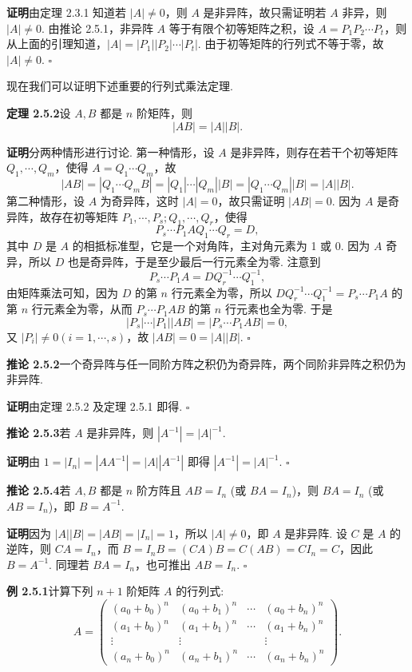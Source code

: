 \documentclass[UTF8, 12pt, fontset=fandol, oneside]{ctexart}
\begin{document}
\noindent\textbf{证明}\quad 由定理 2.3.1 知道若 $|A|\ne 0$，则 $A$ 是非异阵，故只需证明若 $A$ 非异，则 $|A|\ne 0$. 由推论 2.5.1，非异阵 $A$ 等于有限个初等矩阵之积，设 $A=P_1P_2\cdots P_t$，则从上面的引理知道，$|A|=|P_1||P_2|\cdots |P_t|$. 由于初等矩阵的行列式不等于零，故 $|A|\ne 0$. $\square$

现在我们可以证明下述重要的行列式乘法定理.

\noindent\textbf{定理 2.5.2}\quad 设 $A,B$ 都是 $n$ 阶矩阵，则
\[
|AB|=|A||B|.
\]

\noindent\textbf{证明}\quad 分两种情形进行讨论. 第一种情形，设 $A$ 是非异阵，则存在若干个初等矩阵 $Q_1,\cdots,Q_m$，使得 $A=Q_1\cdots Q_m$，故
\[
|AB|=|Q_1\cdots Q_mB|=|Q_1|\cdots |Q_m||B|=|Q_1\cdots Q_m||B|=|A||B|.
\]
第二种情形，设 $A$ 为奇异阵，这时 $|A|=0$，故只需证明 $|AB|=0$. 因为 $A$ 是奇异阵，故存在初等矩阵 $P_1,\cdots,P_s;Q_1,\cdots,Q_r$，使得
\[
P_s\cdots P_1AQ_1\cdots Q_r=D,
\]
其中 $D$ 是 $A$ 的相抵标准型，它是一个对角阵，主对角元素为 1 或 0. 因为 $A$ 奇异，所以 $D$ 也是奇异阵，于是至少最后一行元素全为零. 注意到
\[
P_s\cdots P_1A=DQ_r^{-1}\cdots Q_1^{-1},
\]
由矩阵乘法可知，因为 $D$ 的第 $n$ 行元素全为零，所以 $DQ_r^{-1}\cdots Q_1^{-1}=P_s\cdots P_1A$ 的第 $n$ 行元素全为零，从而 $P_s\cdots P_1AB$ 的第 $n$ 行元素也全为零. 于是
\[
|P_s|\cdots |P_1||AB|=|P_s\cdots P_1AB|=0,
\]
又 $|P_i|\ne 0(i=1,\cdots,s)$，故 $|AB|=0=|A||B|$. $\square$

\noindent\textbf{推论 2.5.2}\quad 一个奇异阵与任一同阶方阵之积仍为奇异阵，两个同阶非异阵之积仍为非异阵.

\noindent\textbf{证明}\quad 由定理 2.5.2 及定理 2.5.1 即得. $\square$

\noindent\textbf{推论 2.5.3}\quad 若 $A$ 是非异阵，则 $|A^{-1}|=|A|^{-1}$.

\noindent\textbf{证明}\quad 由 $1=|I_n|=|AA^{-1}|=|A||A^{-1}|$ 即得 $|A^{-1}|=|A|^{-1}$. $\square$

\noindent\textbf{推论 2.5.4}\quad 若 $A,B$ 都是 $n$ 阶方阵且 $AB=I_n$ (或 $BA=I_n$)，则 $BA=I_n$ (或 $AB=I_n$)，即 $B=A^{-1}$.

\noindent\textbf{证明}\quad 因为 $|A||B|=|AB|=|I_n|=1$，所以 $|A|\ne 0$，即 $A$ 是非异阵. 设 $C$ 是 $A$ 的逆阵，则 $CA=I_n$，而 $B=I_nB=(CA)B=C(AB)=CI_n=C$，因此 $B=A^{-1}$. 同理若 $BA=I_n$，也可推出 $AB=I_n$. $\square$

\noindent\textbf{例 2.5.1}\quad 计算下列 $n+1$ 阶矩阵 $A$ 的行列式:
\[
A=\left(\begin{array}{cccc}
(a_0+b_0)^n & (a_0+b_1)^n & \cdots & (a_0+b_n)^n\\
(a_1+b_0)^n & (a_1+b_1)^n & \cdots & (a_1+b_n)^n\\
\vdots & \vdots & & \vdots\\
(a_n+b_0)^n & (a_n+b_1)^n & \cdots & (a_n+b_n)^n
\end{array}\right).
\]
\end{document}
